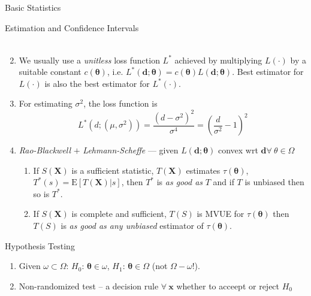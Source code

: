 \documentclass{article}
\newcommand{\E}{\mathrm{E}}
\newcommand{\bx}{\mathbf{x}}
\newcommand{\bX}{\mathbf{X}}
\newcommand{\btheta}{\mathbf{\theta}}
\begin{document}
\begin{section}{Basic Statistics}
\begin{subsection}{Estimation and Confidence Intervals}
\begin{enumerate}
\begin{align}
  \end{align}
\item We usually use a \emph{unitless} loss function $L^{*}$ achieved
  by multiplying $L(\cdot)$ by a suitable constant $c(\btheta)$, i.e.
  $L^{*}(\mathbf{d};\btheta) = c(\btheta) L(\mathbf{d};\btheta)$. Best
  estimator for $L(\cdot)$ is also the best estimator for $L^{*}(\cdot)$.
\item For estimating $\sigma^2$, the loss function is
  \[ L^{*}(d; (\mu, \sigma^2)) = \frac{(d - \sigma^2)^2}{\sigma^4} =
    \left(\frac{d}{\sigma^2} - 1\right)^2 \]
\item \emph{Rao-Blackwell} $+$ \emph{Lehmann-Scheffe} --- given 
  $L(\mathbf{d};\btheta)$ convex wrt $\mathbf{d} \forall\ \theta \in \Omega$
  \begin{enumerate}
  \item If $S(\bX)$ is a sufficient statistic, $T(\bX)$ estimates 
    $\tau(\btheta)$, $T^{*}(s) = \E[T(\bX)|s]$, then $T^{*}$ is
    \emph{as good as} $T$ and if $T$ is unbiased then so is $T^{*}$.
  \item If $S(\bX)$ is complete and sufficient, $T(S)$ is MVUE for
    $\tau(\btheta)$ then $T(S)$ is \emph{as good as any unbiased} estimator
    of $\tau(\btheta)$.
  \end{enumerate}
\end{enumerate}
\end{subsection}

\begin{subsection}{Hypothesis Testing}
\begin{enumerate}
\item Given $\omega \subset \Omega$: $H_{0}$: $\btheta \in \omega$,
  $H_{1}$: $\btheta \in \Omega$ (not $\Omega - \omega$!).
\item Non-randomized test -- a decision rule $\forall\ \bx$ whether to
  acceept or reject $H_{0}$ 
\end{enumerate}
\end{subsection}
\end{section}
\end{document}
